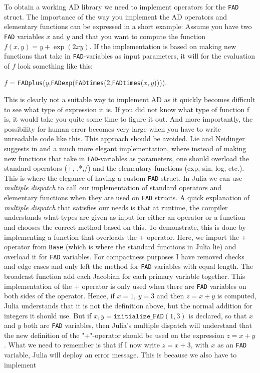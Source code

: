 To obtain a working AD library we need to implement operators for the \texttt{FAD} struct. The importance of the way you implement the AD operators and elementary functions can be expressed in a short example: Assume you have two \texttt{FAD} variables $x$ and $y$ and that you want to compute the function $f(x,y) = y+\exp(2xy)$. If the implementation is based on making new functions that take in \texttt{FAD}-variables as input parameters, it will for the evaluation of $f$ look something like this: 
\begin{center}
    $f$ = \texttt{FADplus}($y$,\texttt{FADexp}(\texttt{FADtimes}(2,\texttt{FADtimes}($x,y$)))).
\end{center}
This is clearly not a suitable way to implement AD as it quickly becomes difficult to see what type of expression it is. If you did not know what type of function f is, it would take you quite some time to figure it out. And more importantly, the possibility for human error becomes very large when you have to write unreadable code like this. This approach should be avoided. Lie and Neidinger suggests in \emph{\cite{lieMrstUrl}} and \emph{\cite{doi:10.1137/080743627}} a much more elegant implementation, where instead of making new functions that take in \texttt{FAD}-variables as parameters, one should overload the standard operators (+,-,*,/) and the elementary functions (exp, sin, log, etc.). This is where the elegance of having a custom \texttt{FAD} struct. In Julia we can use \emph{multiple dispatch} to call our implementation of standard operators and elementary functions when they are used on \texttt{FAD} structs. A quick explanation of \emph{multiple dispatch} that satisfies our needs is that at runtime, the compiler understands what types are given as input for either an operator or a function and chooses the correct method based on this. To demonstrate, this is done by implementing a function  
that overloads the + operator. Here, we import the + operator from \texttt{Base} (which is where the standard functions in Julia lie) and overload it for \texttt{FAD} variables. For compactness purposes I have removed checks and edge cases and only left the method for \texttt{FAD} variables with equal length. The broadcast function add each Jacobian for each primary variable together. This implementation of the + operator is only used when there are \texttt{FAD} variables on both sides of the operator. Hence, if $x = 1$, $y = 3$ and then $z = x+y$ is computed, Julia understands that it is not the definition above, but the normal addition for integers it should use. But if $x,y = \texttt{initialize\_FAD}(1,3)$ is declared, so that $x$ and $y$ both are \texttt{FAD} variables, then Julia's multiple dispatch will understand that the new definition of the "+"-operator should be used on the expression $z = x+y$. What we need to remember is that if I now write $z = x + 3$, with $x$ as an \texttt{FAD} variable, Julia will deploy an error message. This is because we also have to implement
